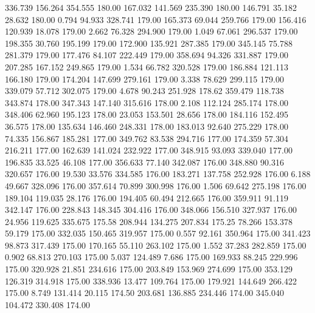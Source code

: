  336.739  156.264  354.555       180.00
 167.032  141.569  235.390       180.00
 146.791   35.182   28.632       180.00
   0.794   94.933  328.741       179.00
 165.373   69.044  259.766       179.00
 156.416  120.939   18.078       179.00
   2.662   76.328  294.900       179.00
   1.049   67.061  296.537       179.00
 198.355   30.760  195.199       179.00
 172.900  135.921  287.385       179.00
 345.145   75.788  281.379       179.00
 177.476   84.107  222.449       179.00
 358.694   94.326  331.887       179.00
 207.285  167.152  249.865       179.00
   1.534   66.782  320.528       179.00
 186.884  121.113  166.180       179.00
 174.204  147.699  279.161       179.00
   3.338   78.629  299.115       179.00
 339.079   57.712  302.075       179.00
   4.678   90.243  251.928       178.62
 359.479  118.738  343.874       178.00
 347.343  147.140  315.616       178.00
   2.108  112.124  285.174       178.00
 348.406   62.960  195.123       178.00
  23.053  153.501   28.656       178.00
 184.116  152.495   36.575       178.00
 135.634  146.460  248.331       178.00
 183.013   92.640  275.229       178.00
  74.335  156.867  185.281       177.00
 349.762   83.538  294.716       177.00
 174.359   57.304  216.211       177.00
 162.639  141.024  232.922       177.00
 348.915   93.093  339.040       177.00
 196.835   33.525   46.108       177.00
 356.633   77.140  342.087       176.00
 348.880   90.316  320.657       176.00
  19.530   33.576  334.585       176.00
 183.271  137.758  252.928       176.00
   6.188   49.667  328.096       176.00
 357.614   70.899  300.998       176.00
   1.506   69.642  275.198       176.00
 189.104  119.035   28.176       176.00
 194.405   60.494  212.665       176.00
 359.911   91.119  342.147       176.00
 228.843  148.345  304.416       176.00
 348.066  156.510  327.937       176.00
  24.956  119.625  335.675       175.58
 208.944  134.275  207.834       175.25
  78.266  153.378   59.179       175.00
 332.035  150.465  319.957       175.00
   0.557   92.161  350.964       175.00
 341.423   98.873  317.439       175.00
 170.165   55.110  263.102       175.00
   1.552   37.283  282.859       175.00
   0.902   68.813  270.103       175.00
   5.037  124.489    7.686       175.00
 169.933   88.245  229.996       175.00
 320.928   21.851  234.616       175.00
 203.849  153.969  274.699       175.00
 353.129  126.319  314.918       175.00
 338.936   13.477  109.764       175.00
 179.921  144.649  266.422       175.00
   8.749  131.414   20.115       174.50
 203.681  136.885  234.446       174.00
 345.040  104.472  330.408       174.00
